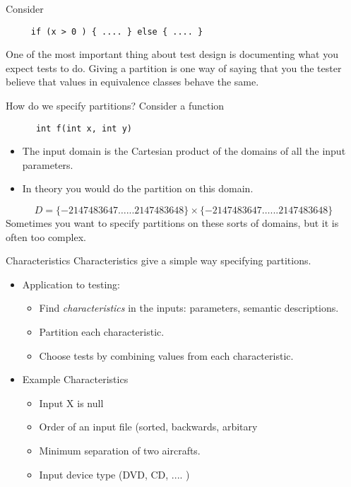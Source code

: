 \documentclass{beamer}
\begin{document}
\begin{frame}[fragile]
 Consider 
  \begin{lstlisting}
     if (x > 0 ) { .... } else { .... }
  \end{lstlisting}
 One of the most important thing about test design is documenting
 what you expect tests to do. Giving a partition is one way of saying
 that you the tester believe that values in equivalence classes behave
 the same.
\end{frame}

\begin{frame}[fragile]{How do we specify partitions?}
  Consider a function
  \begin{lstlisting}
      int f(int x, int y)
    \end{lstlisting}
    \begin{itemize}
    \item The input domain is the Cartesian product of the domains of all the
      input parameters.
    \item In theory you would do the partition on this domain.
    \end{itemize}
    \[
      D = \{ -2147483647 \ldots ... 2147483648\}\times \{ -2147483647
      \ldots ... 2147483648\}
    \]
Sometimes you want to specify partitions on these sorts of domains,
but it is often too complex. 
\end{frame}
\begin{frame}{Characteristics}
 Characteristics give a simple way specifying partitions. 
  \begin{itemize}
  \item Application to testing:
    \begin{itemize}
    \item Find {\em characteristics} in the inputs: parameters,
      semantic descriptions.
    \item Partition each characteristic.
    \item Choose tests by combining values from each characteristic.
    \end{itemize}
  \end{itemize}  
\end{frame}
\begin{frame}
  \begin{itemize}
  \item Example Characteristics
    \begin{itemize}
    \item Input X is null
    \item Order of an input file (sorted, backwards, arbitary
    \item Minimum separation of two aircrafts.
    \item Input device type (DVD, CD, .... )
    \end{itemize}
  \end{itemize}
\end{frame}
\end{document}
